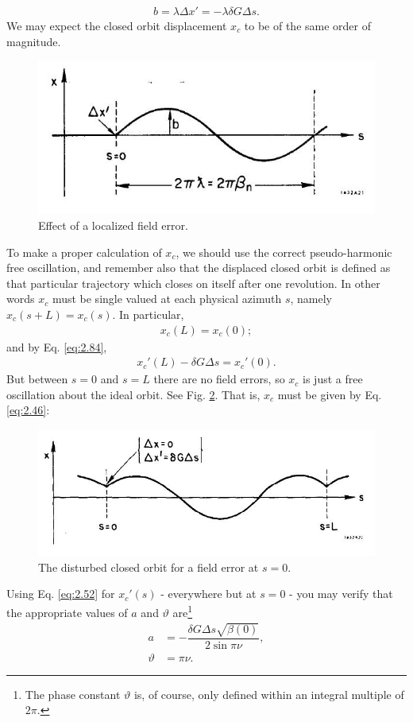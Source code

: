 \begin{align}\label{eq:2.86}
	b = \lambda \Delta x' = -\lambda \delta G \Delta s.
\end{align}
We may expect the closed orbit displacement $x_c$ to be of the same order of magnitude.
\begin{figure}[!htb]
	\centering
	\includegraphics[width=0.8\linewidth]{./Figuras/fig21.jpeg}
	\caption{Effect of a localized field error.}
	\label{fig:fig21}
\end{figure}
To make a proper calculation of $x_c$, we should use the correct pseudo-harmonic free oscillation, and remember also that the displaced closed orbit is defined as that particular
 trajectory which closes on itself after one revolution. In other words $x_c$ must be single valued at each physical azimuth $s$, namely $x_c(s + L) = x_c(s)$. In particular,
 \begin{align}
	x_c(L) = x_c(0);
\end{align}
and by Eq. \eqref{eq:2.84},
\begin{align}
	x_c'(L) - \delta G \Delta s = x_c'(0).
\end{align}
But between $s = 0$ and $s = L$ there are no field errors, so $x_c$ is just a free oscillation about the ideal orbit. See Fig. \ref{fig:fig22}. That is, $x_c$ must be given by Eq. \eqref{eq:2.46}:
\begin{figure}[!htb]
	\centering
	\includegraphics[width=0.8\linewidth]{./Figuras/fig22.jpeg}
	\caption{The disturbed closed orbit for a field error at $s = 0$.}
	\label{fig:fig22}
\end{figure}
Using Eq. \eqref{eq:2.52} for $x_c'(s)$ - everywhere but at $s = 0$ - you may verify that the
appropriate values of $a$ and $\vartheta$ are\footnote{The phase constant $\vartheta$ is, of course, only defined within an integral multiple of $2\pi$.}
\begin{align}
	a &= -\dfrac{\delta G \Delta s \sqrt{\beta(0)}}{2 \sin \pi \nu},\\
    \vartheta &= \pi\nu.
\end{align}

